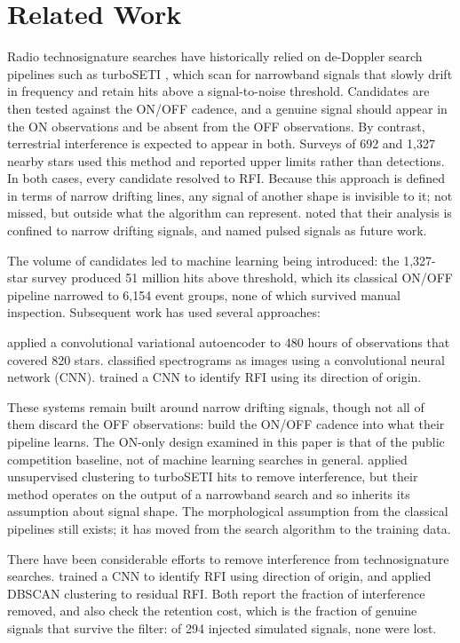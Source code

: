 \documentclass[11pt]{article}
\begin{document}
\section{Related Work}
Radio technosignature searches have historically relied on de-Doppler search pipelines such as turboSETI \citep{enriquez2017}, which scan for narrowband signals that slowly drift in frequency and retain hits above a signal-to-noise threshold. Candidates are then tested against the ON/OFF cadence, and a genuine signal should appear in the ON observations and be absent from the OFF observations. By contrast, terrestrial interference is expected to appear in both. Surveys of 692 and 1,327 nearby stars \citep{enriquez2017,price2020} used this method and reported upper limits rather than detections. In both cases, every candidate resolved to RFI. Because this approach is defined in terms of narrow drifting lines, any signal of another shape is invisible to it; not missed, but outside what the algorithm can represent. \citet{price2020} noted that their analysis is confined to narrow drifting signals, and named pulsed signals as future work.

The volume of candidates led to machine learning being introduced: the 1,327-star survey produced 51 million hits above threshold, which its classical ON/OFF pipeline narrowed to 6,154 event groups, none of which survived manual inspection. Subsequent work has used several approaches:

\citet{ma2023} applied a convolutional variational autoencoder to 480 hours of observations that covered 820 stars. \citet{harp2019} classified spectrograms as images using a convolutional neural network (CNN). \citet{pinchuk2022} trained a CNN to identify RFI using its direction of origin.

These systems remain built around narrow drifting signals, though not all of them discard the OFF observations: \citet{ma2023} build the ON/OFF cadence into what their pipeline learns. The ON-only design examined in this paper is that of the public competition baseline, not of machine learning searches in general. \citet{jacobsonbell2025} applied unsupervised clustering to turboSETI hits to remove interference, but their method operates on the output of a narrowband search and so inherits its assumption about signal shape. The morphological assumption from the classical pipelines still exists; it has moved from the search algorithm to the training data.

There have been considerable efforts to remove interference from technosignature searches. \citet{pinchuk2022} trained a CNN to identify RFI using direction of origin, and \citet{zhao2026} applied DBSCAN clustering to residual RFI. Both report the fraction of interference removed, and \citeauthor{zhao2026} also check the retention cost, which is the fraction of genuine signals that survive the filter: of 294 injected simulated signals, none were lost.
\end{document}
